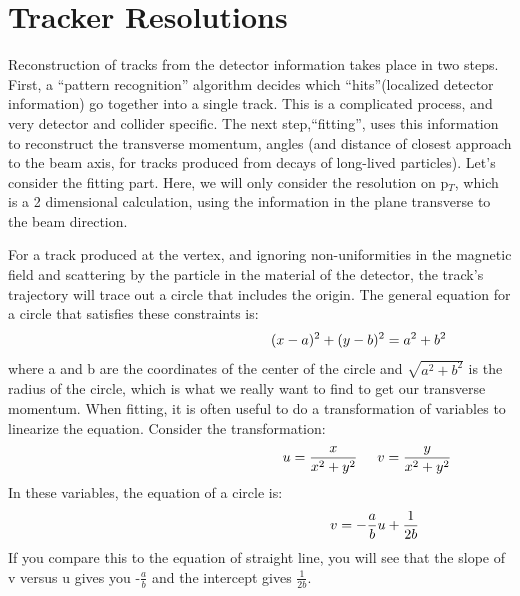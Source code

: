 \section{Tracker Resolutions}
Reconstruction of tracks from the detector information takes place in two steps. First, a ``pattern recognition'' algorithm decides which ``hits''(localized detector information) go together into a single track. This is a complicated process, and very detector and collider specific. The next step,``fitting'', uses this information to reconstruct the transverse momentum, angles (and distance of closest approach to the beam axis, for tracks produced from decays of long-lived particles).  
Let's consider the fitting part.  Here, we will only consider the resolution on p$_{T}$, which is a 2 dimensional calculation, using the information in the plane transverse to the beam direction.   

For a track produced at the vertex, and ignoring non-uniformities in the magnetic field and scattering by the particle in the material of the detector, the track's trajectory will trace out a circle that includes the origin.  The general equation for a circle that satisfies these constraints is:
\begin{equation}\hspace{50 mm}
(x-a)^{2}+(y-b)^{2}=a^{2}+b^{2}
\end{equation}
where a and b are the coordinates of the center of the circle and $\sqrt{a^{2}+b^{2}}$ is the radius of the circle, which is what we really want to find to get our transverse momentum.
When fitting, it is often useful to do a transformation of variables to linearize the equation.  Consider the transformation:
\begin{equation}\hspace {54mm}
u=\frac{x}{x^{2}+y^{2}} \hspace{5 mm} v=\frac{y}{x^{2}+y^{2}}
\end{equation}
\noindent
In these variables, the equation of a circle is:
\begin{equation}\hspace{58 mm}
v =-\frac{a}{b}u+\frac{1}{2b}
\end{equation}
If you compare this to the equation of straight line, you will see that the slope of v versus u gives you -$\frac{a}{b}$ and the intercept gives $\frac{1}{2b}$.

